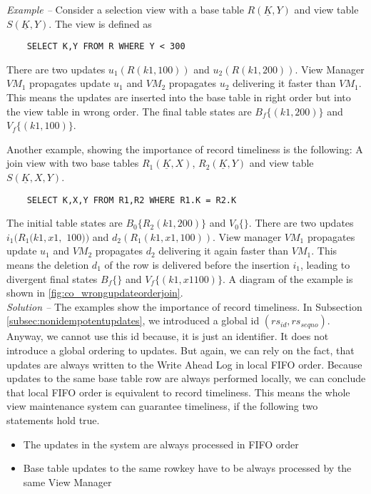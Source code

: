 \documentclass[11pt,a4paper,bibtotoc,idxtotoc,headsepline,footsepline,footexclude,BCOR12mm,DIV13]{scrbook}
\begin{document}
\noindent 
\emph{Example -- }Consider a selection view with a base table $R(\underline{K},Y)$ and view table $S(\underline{K},Y)$. The view is defined as
\begin{verbatim}
	SELECT K,Y FROM R WHERE Y < 300
\end{verbatim}
There are two updates $u_1(R(k1, 100))$ and $u_2(R(k1, 200))$. View Manager $VM_1$ propagates update $u_1$ and $VM_2$ propagates $u_2$ delivering it faster than $VM_1$. This means the updates are inserted into the base table in right order  but into the view table in wrong order. The final table states are $B_f\{(k1, 200)\}$ and $V_f\{(k1, 100)\}$.

Another example, showing the importance of record timeliness is the following: A join view with two base tables $R_1(\underline{K},X)$, $R_2(\underline{K},Y)$ and view table $S(\underline{K},X,Y)$. 
\begin{verbatim}
	SELECT K,X,Y FROM R1,R2 WHERE R1.K = R2.K
\end{verbatim}
The initial table states are $B_0\{R_2(k1, 200)\}$ and $V_0\{\}$. There are two updates $i_1(R_1(k1,x1,$ $100))$ and $d_2(R_1(k1,x1,100))$. View manager $VM_1$ propagates update $u_1$ and $VM_2$ propagates $d_2$ delivering it again faster than $VM_1$. This means the deletion $d_1$ of the row is delivered before the insertion $i_1$, leading to divergent final states  $B_f\{\}$ and $V_f\{(k1,x1 100)\}$. A diagram of the example is shown in  \ref{fig:co_wrongupdateorderjoin}.\\

\noindent  
\emph{Solution -- }The examples show the importance of record timeliness. In Subsection \ref{subsec:nonidempotentupdates}, we introduced a global id $(rs_{id}, rs_{seqno})$. Anyway, we cannot use this id because, it is just an identifier. It does not introduce a global ordering to updates.  But again, we can rely on the fact, that updates are always written to the Write Ahead Log in local FIFO order. Because updates to the same base table row are always performed locally, we can conclude that local FIFO order is equivalent to record timeliness. This means the whole view maintenance system can guarantee timeliness, if the following two statements hold true.
\begin{itemize}
	\item The updates in the system are always processed in FIFO order
	\item Base table updates to the same rowkey have to be always processed by the same View Manager
\end{itemize}
\end{document}
